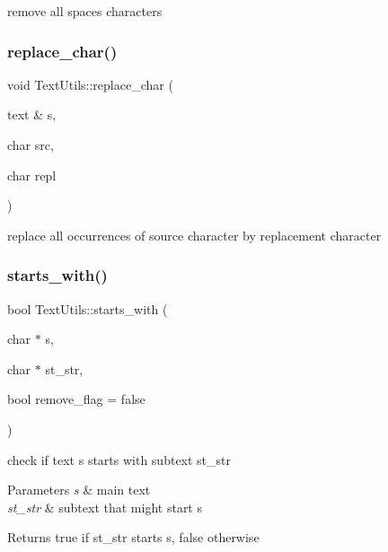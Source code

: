 remove all spaces characters \mbox{\label{classez_1_1essential_1_1TextUtils_ac2bffa195205d8bf85d718ef399292ed}} 
\subsubsection{\texorpdfstring{replace\+\_\+char()}{replace\_char()}}
{\footnotesize\ttfamily void Text\+Utils\+::replace\+\_\+char (\begin{DoxyParamCaption}\item[{text \&}]{s,  }\item[{char}]{src,  }\item[{char}]{repl }\end{DoxyParamCaption})\hspace{0.3cm}{\ttfamily [static]}}

replace all occurrences of source character by replacement character \mbox{\label{classez_1_1essential_1_1TextUtils_a1d36db6f2b9d9f2225936f73e5c9d35f}} 
\subsubsection{\texorpdfstring{starts\+\_\+with()}{starts\_with()}}
{\footnotesize\ttfamily bool Text\+Utils\+::starts\+\_\+with (\begin{DoxyParamCaption}\item[{char $\ast$}]{s,  }\item[{char $\ast$}]{st\+\_\+str,  }\item[{bool}]{remove\+\_\+flag = {\ttfamily false} }\end{DoxyParamCaption})\hspace{0.3cm}{\ttfamily [static]}}

check if text s starts with subtext st\+\_\+str 
\begin{DoxyParams}{Parameters}
{\em s} & main text \\
\hline
{\em st\+\_\+str} & subtext that might start s \\
\hline
\end{DoxyParams}
\begin{DoxyReturn}{Returns}
true if st\+\_\+str starts s, false otherwise 
\end{DoxyReturn}
\mbox{\label{classez_1_1essential_1_1TextUtils_a8050a5348d530a5e68470b68f7779d0a}} 
